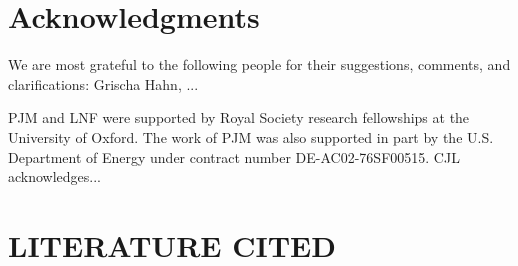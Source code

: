 \documentclass{ar2e}
\begin{document}



\section*{Acknowledgments}

We are most grateful to the following people for their suggestions, 
comments, and clarifications: Grischa Hahn, ... 

PJM and LNF were supported by Royal Society research fellowships at the
University of Oxford. The work of PJM was also supported in part  by the U.S.
Department of Energy under contract number DE-AC02-76SF00515.
%
CJL acknowledges...



\section{LITERATURE CITED}





\end{document}
